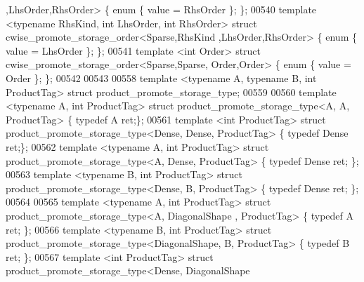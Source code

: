 \begin{DoxyCode}
{      ,LhsOrder,RhsOrder>                \{ \textcolor{keyword}{enum} \{ value = RhsOrder \}; \};
00540 \textcolor{keyword}{template} <\textcolor{keyword}{typename} RhsKind, \textcolor{keywordtype}{int} LhsOrder, \textcolor{keywordtype}{int} RhsOrder>   \textcolor{keyword}{struct }cwise\_promote\_storage\_order<Sparse,RhsKind
      ,LhsOrder,RhsOrder>                \{ \textcolor{keyword}{enum} \{ value = LhsOrder \}; \};
00541 \textcolor{keyword}{template} <\textcolor{keywordtype}{int} Order>                                      \textcolor{keyword}{struct }cwise\_promote\_storage\_order<Sparse,Sparse,
      Order,Order>                       \{ \textcolor{keyword}{enum} \{ value = Order \}; \};
00542 
00543 
00558 \textcolor{keyword}{template} <\textcolor{keyword}{typename} A, \textcolor{keyword}{typename} B, \textcolor{keywordtype}{int} ProductTag> \textcolor{keyword}{struct }product\_promote\_storage\_type;
00559 
00560 \textcolor{keyword}{template} <\textcolor{keyword}{typename} A, \textcolor{keywordtype}{int} ProductTag> \textcolor{keyword}{struct }product\_promote\_storage\_type<A,                  A,           
             ProductTag> \{ \textcolor{keyword}{typedef} A     ret;\};
00561 \textcolor{keyword}{template} <\textcolor{keywordtype}{int} ProductTag>             \textcolor{keyword}{struct }product\_promote\_storage\_type<Dense,              Dense,       
             ProductTag> \{ \textcolor{keyword}{typedef} Dense ret;\};
00562 \textcolor{keyword}{template} <\textcolor{keyword}{typename} A, \textcolor{keywordtype}{int} ProductTag> \textcolor{keyword}{struct }product\_promote\_storage\_type<A,                  Dense,       
             ProductTag> \{ \textcolor{keyword}{typedef} Dense ret; \};
00563 \textcolor{keyword}{template} <\textcolor{keyword}{typename} B, \textcolor{keywordtype}{int} ProductTag> \textcolor{keyword}{struct }product\_promote\_storage\_type<Dense,              B,           
             ProductTag> \{ \textcolor{keyword}{typedef} Dense ret; \};
00564 
00565 \textcolor{keyword}{template} <\textcolor{keyword}{typename} A, \textcolor{keywordtype}{int} ProductTag> \textcolor{keyword}{struct }product\_promote\_storage\_type<A,                  DiagonalShape
      ,      ProductTag> \{ \textcolor{keyword}{typedef} A ret; \};
00566 \textcolor{keyword}{template} <\textcolor{keyword}{typename} B, \textcolor{keywordtype}{int} ProductTag> \textcolor{keyword}{struct }product\_promote\_storage\_type<DiagonalShape,      B,           
             ProductTag> \{ \textcolor{keyword}{typedef} B ret; \};
00567 \textcolor{keyword}{template} <\textcolor{keywordtype}{int} ProductTag>             \textcolor{keyword}{struct }product\_promote\_storage\_type<Dense,              DiagonalShape
}
\end{DoxyCode}
